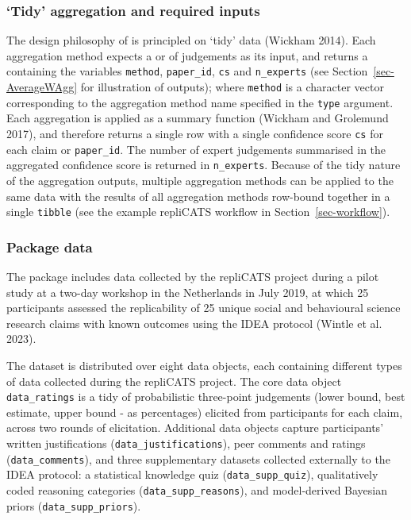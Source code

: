 \documentclass[
  11pt,
  a4paper,
]{article}
\begin{document}
\subsubsection{`Tidy' aggregation and required
inputs}\label{sec-tidy-aggregation}

The design philosophy of  is principled on `tidy' data
(Wickham 2014). Each aggregation method expects a  or
 of judgements as its input, and returns a 
containing the variables \texttt{method}, \texttt{paper\_id},
\texttt{cs} and \texttt{n\_experts} (see Section~\ref{sec-AverageWAgg}
for illustration of outputs); where \texttt{method} is a character
vector corresponding to the aggregation method name specified in the
\texttt{type} argument. Each aggregation is applied as a summary
function (Wickham and Grolemund 2017), and therefore returns a single
row with a single confidence score \texttt{cs} for each claim or
\texttt{paper\_id}. The number of expert judgements summarised in the
aggregated confidence score is returned in \texttt{n\_experts}. Because
of the tidy nature of the aggregation outputs, multiple aggregation
methods can be applied to the same data with the results of all
aggregation methods row-bound together in a single \texttt{tibble} (see
the example repliCATS workflow in Section~\ref{sec-workflow}).

\subsubsection{Package data}\label{sec-package-data}

The  package includes data collected by the repliCATS
project during a pilot study at a two-day workshop in the Netherlands in
July 2019, at which 25 participants assessed the replicability of 25
unique social and behavioural science research claims with known
outcomes using the IDEA protocol (Wintle et al. 2023).

The dataset is distributed over eight data objects, each containing
different types of data collected during the repliCATS project. The core
data object \texttt{data\_ratings} is a tidy  of
probabilistic three-point judgements (lower bound, best estimate, upper
bound - as percentages) elicited from participants for each claim,
across two rounds of elicitation. Additional data objects capture
participants' written justifications (\texttt{data\_justifications}),
peer comments and ratings (\texttt{data\_comments}), and three
supplementary datasets collected externally to the IDEA protocol: a
statistical knowledge quiz (\texttt{data\_supp\_quiz}), qualitatively
coded reasoning categories (\texttt{data\_supp\_reasons}), and
model-derived Bayesian priors (\texttt{data\_supp\_priors}).
\end{document}
